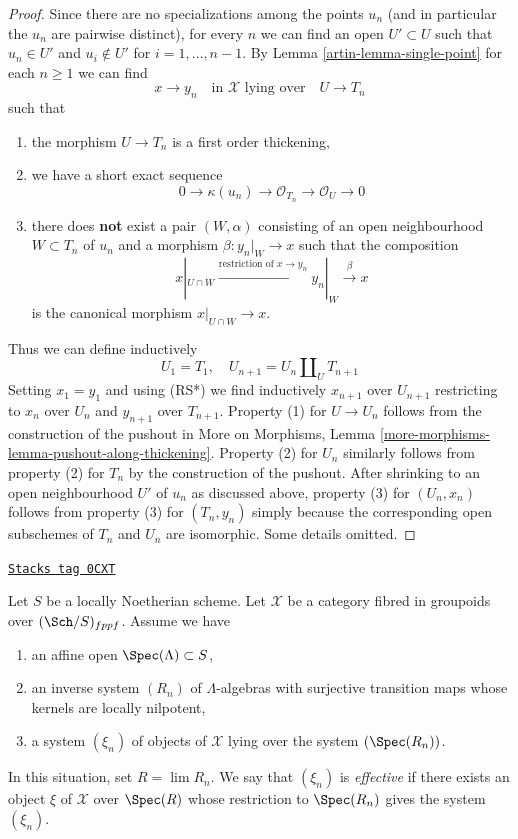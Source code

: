 \begin{proof}

Since there are no specializations among the points $u_n$ (and in
particular the $u_n$ are pairwise distinct), for every $n$
we can find an open $U' \subset U$
such that $u_n \in U'$ and $u_i \not \in U'$ for $i = 1, \ldots, n - 1$.
By Lemma \ref{artin-lemma-single-point} for each $n \geq 1$ we can find
$$
x \to y_n
\quad\text{in }\mathcal{X}\text{ lying over}\quad
U \to T_n
$$
such that
\begin{enumerate}
\item the morphism $U \to T_n$ is a first order thickening,
\item we have a short exact sequence
$$
0 \to \kappa(u_n) \to \mathcal{O}_{T_n} \to \mathcal{O}_U \to 0
$$
\item there does {\bf not} exist a pair $(W, \alpha)$
consisting of an open neighbourhood $W \subset T_n$ of $u_n$
and a morphism $\beta : y_n|_W \to x$ such that the composition
$$
x|_{U \cap W} \xrightarrow{\text{restriction of }x \to y_n}
y_n|_W \xrightarrow{\beta} x
$$
is the canonical morphism $x|_{U \cap W} \to x$.
\end{enumerate}
Thus we can define inductively
$$
U_1 = T_1, \quad
U_{n + 1} = U_n \amalg_U T_{n + 1}
$$
Setting $x_1 = y_1$ and using (RS*) we find inductively
$x_{n + 1}$ over $U_{n + 1}$ restricting to
$x_n$ over $U_n$ and $y_{n + 1}$ over $T_{n + 1}$.
Property (1) for $U \to U_n$ follows from the construction
of the pushout in More on Morphisms, Lemma
\ref{more-morphisms-lemma-pushout-along-thickening}.
Property (2) for $U_n$ similarly follows from
property (2) for $T_n$ by the construction of the pushout.
After shrinking to an open neighbourhood $U'$ of $u_n$
as discussed above, property (3) for $(U_n, x_n)$ follows from property (3)
for $(T_n, y_n)$ simply because the corresponding open subschemes
of $T_n$ and $U_n$ are isomorphic. Some details omitted.
\end{proof}

\begin{remark}

\label{artin-remark-strong-effectiveness}
\href{https://stacks.math.columbia.edu/tag/0CXT}{\texttt{Stacks tag 0CXT}}

Let $S$ be a locally Noetherian scheme.
Let $\mathcal{X}$ be a category fibred in groupoids over $(\Sch/S)_{fppf}$.
Assume we have
\begin{enumerate}
\item an affine open $\Spec(\Lambda) \subset S$,
\item an inverse system $(R_n)$ of $\Lambda$-algebras
with surjective transition maps whose kernels are locally nilpotent,
\item a system $(\xi_n)$ of objects of $\mathcal{X}$ lying
over the system $(\Spec(R_n))$.
\end{enumerate}
In this situation, set $R = \lim R_n$. We say that
$(\xi_n)$ is {\it effective} if there exists an object
$\xi$ of $\mathcal{X}$ over $\Spec(R)$ whose restriction
to $\Spec(R_n)$ gives the system $(\xi_n)$.
\end{remark}

